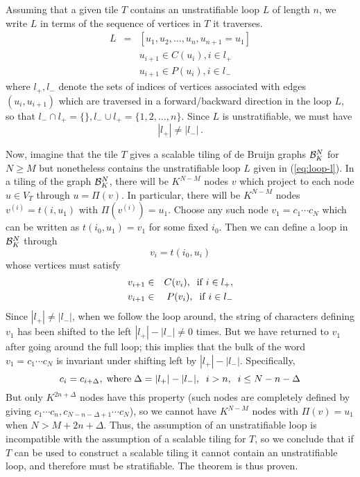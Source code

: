 \documentclass[12pt]{article}
\begin{document}
Assuming that a given tile $T$ contains an unstratifiable loop $L$ of
length $n$, we write $L$ in terms of the sequence of vertices in $T$
it traverses.
\begin{eqnarray}
L & = & [u_1, u_2, \ldots, u_{n}, u_{n + 1} =u_1] \label{eq:loop-l}\\
& &u_{i + 1} \in C (u_i), i \in l_+   \nonumber\\
& &u_{i + 1} \in P (u_i), i \in l_- \nonumber
\end{eqnarray}
where $l_+, l_-$ denote the sets of indices of vertices associated
with edges $(u_i, u_{i + 1})$
which are traversed in a forward/backward direction in the loop
$L$, so that $l_- \cap l_+ =\{\}, l_- \cup l_+ =\{1, 2, \ldots, n\}$.
Since $L$ is unstratifiable, we must have
\begin{equation}
| l_+ | \neq | l_-| \,.
\end{equation}

Now, imagine that the tile $T$  gives a scalable
tiling of de Bruijn graphs ${\cal B}_K^N$ for $N \geq M$ but nonetheless
contains the unstratifiable loop $L$ given in  (\ref{eq:loop-l}).  In a
tiling of the graph  ${\cal B}_K^N$, there will be $K^{N -M}$ nodes
$v$ which project to each node $u \in V_T$ through $u = \Pi (v)$.
In particular, there will be $K^{N -M}$ nodes $v^{(i)} =t (i, u_1)$ with
$\Pi (v^{(i)}) = u_1$.  Choose any such node $v_1 = c_1 \cdots c_N$ which
can be written as $t
(i_0, u_1) = v_1$ for some fixed
$i_0$.  Then we can define a loop in ${\cal B}_K^N$ through
\begin{equation}
v_i = t (i_0, u_i)
\end{equation}
whose vertices must satisfy
\begin{eqnarray}
v_{i + 1} & \in & C (v_i), \; \;{\rm if} \;i\in l_+, \\
v_{i + 1} & \in & P (v_i), \; \;{\rm if} \; i\in l_-
\end{eqnarray}
Since $| l_+ | \neq | l_- |$, when we follow the loop around, the string
of characters defining $v_1$ has been shifted to the left $| l_+ | -|
l_-|\neq 0$ times.  But we have returned to $v_1$ after going around the
full loop; this implies that the bulk of the word $v_1 = c_1 \cdots
c_N$ is invariant under shifting left by $| l_+ | -| l_- |$.
Specifically,
\begin{equation}
c_i = c_{i + \Delta}, \;{\rm where} \; \Delta= | l_+ | -| l_- |, \; \;i
> n,  \; \;i
\leq N - n -\Delta
\end{equation}
But only $K^{2 n + \Delta}$ nodes have this property (such nodes are
completely defined by giving $c_1 \cdots c_n, c_{N -n-\Delta+1} \cdots
c_N$), so we cannot have 
$K^{N -M}$ nodes with $\Pi (v) = u_1$ when $N > M+ 2n + \Delta$.  Thus, the
assumption of an unstratifiable loop is incompatible with the
assumption of a scalable tiling for $T$, so we conclude that if
$T$ can be used to construct a scalable tiling it cannot contain an
unstratifiable loop, and therefore must be stratifiable.  The theorem
is thus proven.
\vspace*{0.2in}
\end{document}
